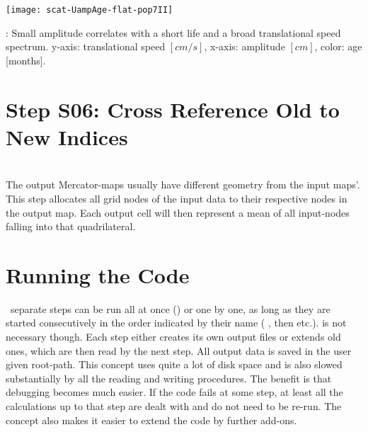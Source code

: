 \begin{marginfigure}
		\texttt{[image: scat-UampAge-flat-pop7II]}
		\caption{\popSevenII: Small amplitude correlates with a short life and a broad translational speed spectrum. y-axis: translational speed $[cm/s]$, x-axis: amplitude $[cm]$, color: age [months].}
		\label{fig:scat-UampAge-flat-pop7II}
\end{marginfigure}

\section*{Step S06: Cross Reference Old to New Indices} \label{S:06}
\\
The output Mercator-maps usually have different geometry from the input maps'.
This step allocates all grid nodes of the input data
to their respective nodes in the output map. Each output cell will then represent a mean of all input-nodes falling into that quadrilateral.



\section{Running the Code}
~separate steps can be run all at once () or one by one, as
long as they are started consecutively in the order indicated by their name
( , then  etc.).  is not necessary
though. Each step either creates its own output files or extends old ones,  which are then read by the next step.
All output data is saved in the user given root-path.
This concept uses quite a lot of disk space and is also slowed substantially by all the reading and writing procedures. The benefit is that debugging becomes much easier. If the code fails at some step,
at least all the calculations up to that step are dealt with and do not need to
be re-run. The concept also makes it easier to extend the code by further
add-ons.
